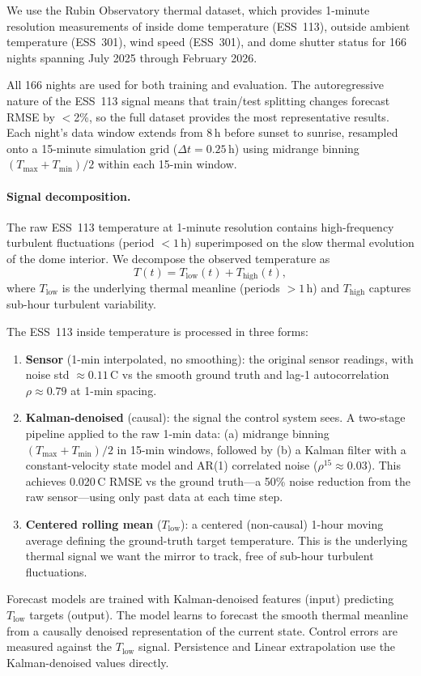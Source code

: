\documentclass[11pt]{article}
\begin{document}
We use the Rubin Observatory thermal dataset, which provides
1-minute resolution measurements of inside dome temperature (ESS~113), outside
ambient temperature (ESS~301), wind speed (ESS~301), and dome shutter status
for 166 nights spanning July 2025 through February 2026.

All 166 nights are used for both training and evaluation.  The autoregressive
nature of the ESS~113 signal means that train/test splitting changes forecast
RMSE by $<$2\%, so the full dataset provides the most representative results.
Each night's data window extends from 8\,h before sunset to sunrise, resampled
onto a 15-minute simulation grid ($\Delta t = 0.25$\,h) using midrange binning
$(T_\mathrm{max} + T_\mathrm{min})/2$ within each 15-min window.

\paragraph{Signal decomposition.}
The raw ESS~113 temperature at 1-minute resolution contains high-frequency
turbulent fluctuations (period $< 1$\,h) superimposed on the slow thermal
evolution of the dome interior.  We decompose the observed temperature as
\begin{equation}
  T(t) = T_\mathrm{low}(t) + T_\mathrm{high}(t),
\end{equation}
where $T_\mathrm{low}$ is the underlying thermal meanline (periods $> 1$\,h)
and $T_\mathrm{high}$ captures sub-hour turbulent variability.

The ESS~113 inside temperature is processed in three forms:
\begin{enumerate}
  \item \textbf{Sensor} (1-min interpolated, no smoothing): the original sensor
    readings, with noise std $\approx 0.11$\,\textdegree C vs the smooth
    ground truth and lag-1 autocorrelation $\rho \approx 0.79$ at 1-min spacing.
  \item \textbf{Kalman-denoised} (causal): the signal the control system sees.
    A two-stage pipeline applied to the raw 1-min data:
    (a) midrange binning $(T_\mathrm{max} + T_\mathrm{min})/2$ in 15-min windows,
    followed by (b) a Kalman filter with a constant-velocity state model and
    AR(1) correlated noise ($\rho^{15} \approx 0.03$).  This achieves
    0.020\,\textdegree C RMSE vs the ground truth---a 50\% noise
    reduction from the raw sensor---using only past data at each time step.
  \item \textbf{Centered rolling mean} ($T_\mathrm{low}$): a centered (non-causal)
    1-hour moving average defining the ground-truth target temperature.
    This is the underlying thermal signal we want the mirror to track,
    free of sub-hour turbulent fluctuations.
\end{enumerate}
Forecast models are trained with Kalman-denoised features (input) predicting
$T_\mathrm{low}$ targets (output).  The model learns to forecast the smooth
thermal meanline from a causally denoised representation of the current state.
Control errors are measured against the $T_\mathrm{low}$ signal.
Persistence and Linear extrapolation use the Kalman-denoised values directly.
\end{document}
